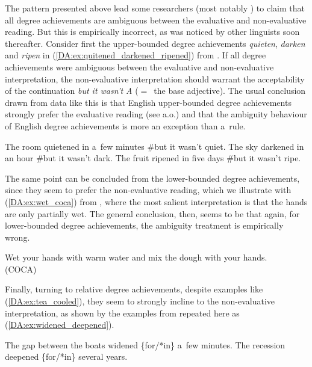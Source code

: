 \documentclass[output=paper]{langscibook}
\begin{document}
The pattern presented above lead some researchers (most notably \citealt{abusch_verbs_1986}) to claim that all degree achievements are ambiguous between the evaluative and non-evaluative reading. But this is empirically incorrect, as was noticed by other linguists soon thereafter. Consider first the upper-bounded degree achievements \textit{quieten}, \textit{darken} and \textit{ripen} in (\ref{DA:ex:quitened_darkened_ripened}) from \citet[ex. 36--38]{kearns_telic_2007}. If all degree achievements were ambiguous between the evaluative and non-evaluative interpretation, the non-evaluative interpretation should warrant the acceptability of the continuation \textit{but it wasn't A} ($=$~the base adjective). The usual conclusion drawn from data like this is that English upper-bounded degree achievements strongly prefer the evaluative reading (see \citealt{hay_scalar_1999,kennedy2008measure} a.o.) and that the ambiguity behaviour of English degree achievements is more an exception than a~rule.

\ea\label{DA:ex:quitened_darkened_ripened}
\ea The room quietened in a~few minutes \#but it wasn’t quiet.
\ex The sky darkened in an hour \#but it wasn’t dark.
\ex The fruit ripened in five days \#but it wasn’t ripe.
\z\z

\noindent The same point can be concluded from the lower-bounded degree achievements, since they seem to prefer the non-evaluative reading, which we illustrate with (\ref{DA:ex:wet_coca}) from \citet{davies2009}, where the most salient interpretation is that the hands are only partially wet. The general conclusion, then, seems to be that again, for lower-bounded degree achievements, the ambiguity treatment is empirically wrong.

\ea\label{DA:ex:wet_coca} Wet your hands with warm water and mix the dough with your hands.\\\hfill (COCA)
\z

\noindent Finally, turning to relative degree achievements, despite examples like (\ref{DA:ex:tea_cooled}), they seem to strongly incline to the non-evaluative interpretation, as shown by the examples from \citet[ex. 6]{kennedy2008measure} repeated here as (\ref{DA:ex:widened_deepened}). 

\ea\label{DA:ex:widened_deepened}
\ea The gap between the boats widened \{for/*in\} a~few minutes.
\ex The recession deepened \{for/*in\} several years.
\z\z
\end{document}

